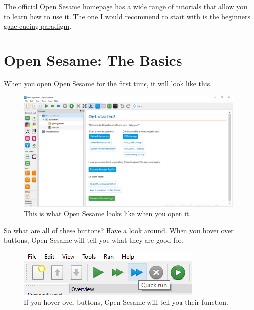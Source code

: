 \documentclass[
]{book}
\begin{document}
The \href{osdoc.cogsci.nl}{official Open Sesame homepage} has a wide range of tutorials that allow you to learn how to use it. The one I would recommend to start with is the \href{https://osdoc.cogsci.nl/3.3/tutorials/beginner/}{beginners gaze cueing paradigm}.

\hypertarget{open-sesame-the-basics}{%
\section{Open Sesame: The Basics}\label{open-sesame-the-basics}}

When you open Open Sesame for the first time, it will look like this.

\begin{figure}

{\centering \includegraphics[width=0.85\linewidth]{images/opensesame/OpenSesameopen} 

}

\caption{This is what Open Sesame looks like when you open it.}\label{fig:Figure12-2}
\end{figure}

So what are all of these buttons? Have a look around. When you hover over buttons, Open Sesame will tell you what they are good for.

\begin{figure}

{\centering \includegraphics[width=0.85\linewidth]{images/opensesame/hover} 

}

\caption{If you hover over buttons, Open Sesame will tell you their function.}\label{fig:Figure12-3}
\end{figure}
\end{document}
